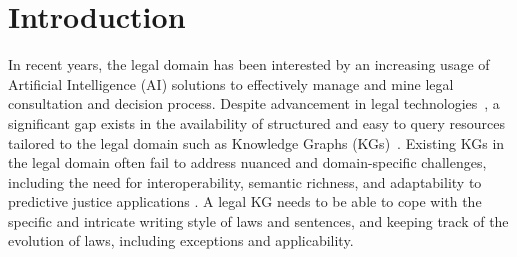 \documentclass[runningheads]{llncs}
\begin{document}
\section{Introduction}
In recent years, the legal domain has been interested by an increasing usage of Artificial Intelligence (AI) solutions \cite{diPorto2024,li2024construction} to effectively manage and mine legal consultation and decision process. %
Despite %
advancement in legal technologies~\cite{Westermann19}, a significant gap exists in the availability of structured and easy to query resources tailored to the legal domain such as Knowledge Graphs (KGs)~\cite{hogan2022knowledge}. Existing KGs in the legal domain often fail to address nuanced and domain-specific challenges, including the need for interoperability, semantic richness, and adaptability to predictive justice applications \cite{changyue_wang__2024,xuran_wang__2024}.
A legal KG needs to be able to cope with the specific and intricate writing style of laws and sentences, and %
keeping  track of the evolution of laws, including exceptions and applicability.
\end{document}
